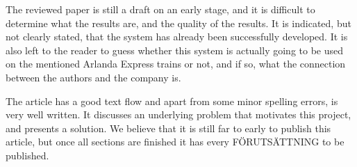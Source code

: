 \documentclass[a4paper,10pt]{article}
\begin{document}
The reviewed paper is still a draft on an early stage, and it is difficult to determine what the results are, and the quality of the results. It is indicated, but not clearly stated, that the system has already been successfully developed. It is also left to the reader to guess whether this system is actually going to be used on the mentioned Arlanda Express trains or not, and if so, what the connection between the authors and the company is.

The article has a good text flow and apart from some minor spelling errors, is very well written. It discusses an underlying problem that motivates this project, and presents a solution. We believe that it is still far to early to publish this article, but once all sections are finished it has every FÖRUTSÄTTNING to be published.

\end{document}
